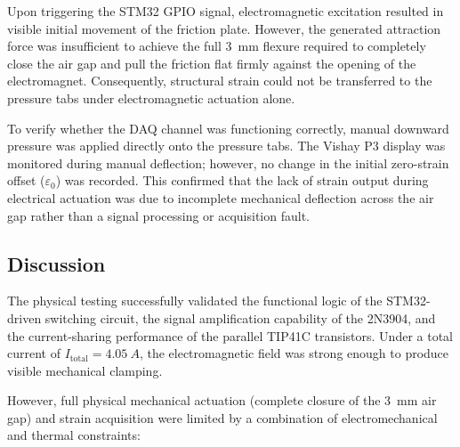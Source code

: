 Upon triggering the STM32 GPIO signal, electromagnetic excitation resulted in visible initial movement of the friction plate. However, the generated attraction force was insufficient to achieve the full \SI{3}{mm} flexure required to completely close the air gap and pull the friction flat firmly against the opening of the electromagnet. Consequently, structural strain could not be transferred to the pressure tabs under electromagnetic actuation alone.

To verify whether the DAQ channel was functioning correctly, manual downward pressure was applied directly onto the pressure tabs. The Vishay P3 display was monitored during manual deflection; however, no change in the initial zero-strain offset ($\varepsilon_0$) was recorded. This confirmed that the lack of strain output during electrical actuation was due to incomplete mechanical deflection across the air gap rather than a signal processing or acquisition fault.

\subsection{Discussion}
The physical testing successfully validated the functional logic of the STM32-driven switching circuit, the signal amplification capability of the 2N3904, and the current-sharing performance of the parallel TIP41C transistors. Under a total current of $I_{\text{total}} = \SI{4.05}{A}$, the electromagnetic field was strong enough to produce visible mechanical clamping. 

However, full physical mechanical actuation (complete closure of the \SI{3}{mm} air gap) and strain acquisition were limited by a combination of electromechanical and thermal constraints:

